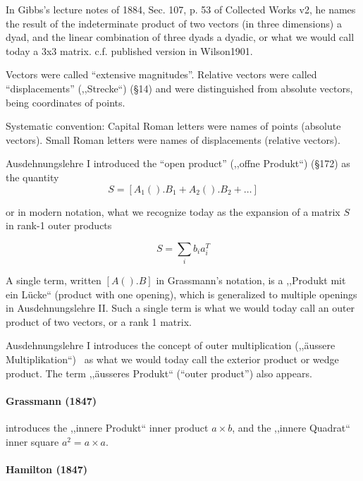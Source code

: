 In Gibbs's lecture notes of 1884, Sec. 107, p. 53 of Collected Works v2, he names the result of the indeterminate product of two vectors (in three dimensions) a dyad, and the linear combination of three dyads a dyadic, or what we would call today a 3x3 matrix. c.f. published version in Wilson1901.

Vectors were called ``extensive magnitudes''. Relative vectors were called ``displacements'' (,,Strecke``) (\S 14) and were distinguished from absolute vectors, being coordinates of points.

Systematic convention: Capital Roman letters were names of points (absolute vectors). Small Roman letters were names of displacements (relative vectors).

Ausdehnungslehre I introduced the ``open product'' (,,offne Produkt``) (\S 172) as the quantity
\[
S = [A_1().B_1 + A_2().B_2 + \dots]
\]

or in modern notation, what we recognize today as the expansion of a matrix $S$ in rank-1 outer products

\[
S = \sum_i b_i a_i^T
\]

A single term, written $[A().B]$ in Grassmann's notation, is a ,,Produkt mit ein Lücke`` (product with one opening), which is generalized to multiple openings in Ausdehnungslehre II. Such a single term is what we would today call an outer product of two vectors, or a rank 1 matrix.

Ausdehnungslehre I introduces the concept of outer multiplication (,,äussere Multiplikation``)~\cite[\S 34, p.57]{Grassmann1844}\cite[p. 81]{Grassmann1995} as what we would today call the exterior product or wedge product. The term ,,äusseres Produkt``\cite[\S 36, p. 60]{Grassmann1844} (``outer product''\cite[p. 84]{Grassmann1995}) also appears.

\paragraph{Grassmann (1847)~\cite{Grassmann1847,Grassmann1995}}

\cite[p. 16]{Grassmann1847}\cite[\S 7, p. 334]{Grassmann1995} introduces the
 ,,innere Produkt`` inner product $a \times b$, and the
 ,,innere Quadrat`` inner square $a^2 = a \times a$.



\paragraph{Hamilton (1847)~\cite{Hamilton1847}}


